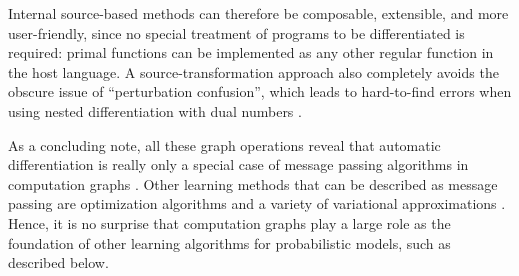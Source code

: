 Internal source-based methods can therefore be composable, extensible, and more user-friendly, since
no special treatment of programs to be differentiated is required: primal functions can be
implemented as any other regular function in the host language.  A source-transformation approach
also completely avoids the obscure issue of \enquote{perturbation confusion}, which leads to
hard-to-find errors when using nested differentiation with dual numbers
\parencite{baydin2018automatic,manzyuk2019perturbation}.

As a concluding note, all these graph operations reveal that automatic differentiation is really
only a special case of message passing algorithms in computation graphs
\parencite{minka2019automatic}.  Other learning methods that can be described as message passing are
optimization algorithms \parencite{ruozzi2011message,dauwels2005steepest} and a variety of
variational approximations \parencite{winn2005variational,minka2005divergence}.  Hence, it is no
surprise that computation graphs play a large role as the foundation of other learning algorithms
for probabilistic models, such as described below.

